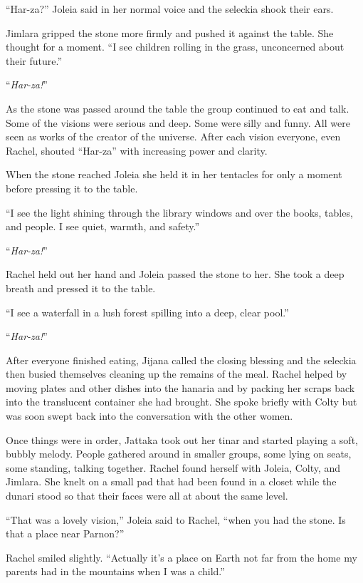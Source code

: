 ``Har-za?'' Joleia said in her normal voice and the seleckia shook their ears.

Jimlara gripped the stone more firmly and pushed it against the table. She thought for a moment.
``I see children rolling in the grass, unconcerned about their future.''

``\textit{Har-za!}''

As the stone was passed around the table the group continued to eat and talk. Some of the
visions were serious and deep. Some were silly and funny. All were seen as works of the creator
of the universe. After each vision everyone, even Rachel, shouted ``Har-za'' with increasing
power and clarity.

When the stone reached Joleia she held it in her tentacles for only a moment before pressing it
to the table.

``I see the light shining through the library windows and over the books, tables, and people. I
see quiet, warmth, and safety.''

``\textit{Har-za!}''

Rachel held out her hand and Joleia passed the stone to her. She took a deep breath and pressed
it to the table.

``I see a waterfall in a lush forest spilling into a deep, clear pool.''

``\textit{Har-za!}''

After everyone finished eating, Jijana called the closing blessing and the seleckia then busied
themselves cleaning up the remains of the meal. Rachel helped by moving plates and other dishes
into the hanaria and by packing her scraps back into the translucent container she had brought.
She spoke briefly with Colty but was soon swept back into the conversation with the other women.

Once things were in order, Jattaka took out her tinar and started playing a soft, bubbly melody.
People gathered around in smaller groups, some lying on seats, some standing, talking together.
Rachel found herself with Joleia, Colty, and Jimlara. She knelt on a small pad that had been
found in a closet while the dunari stood so that their faces were all at about the same level.

``That was a lovely vision,'' Joleia said to Rachel, ``when you had the stone. Is that a place
near Parnon?''

Rachel smiled slightly. ``Actually it's a place on Earth not far from the home my parents had in
the mountains when I was a child.''

